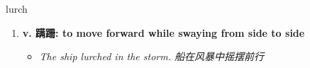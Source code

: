 
\begin{frame}
{\huge lurch}
\begin{center}
\begin{enumerate}\Large
  \item \textbf{v. 蹒跚: to move forward while swaying from side to side}
  \begin{itemize}
    \item \em{\Large{The ship lurched in the storm. 船在风暴中摇摆前行}}
  \end{itemize}
\end{enumerate}
\end{center}
\end{frame}
